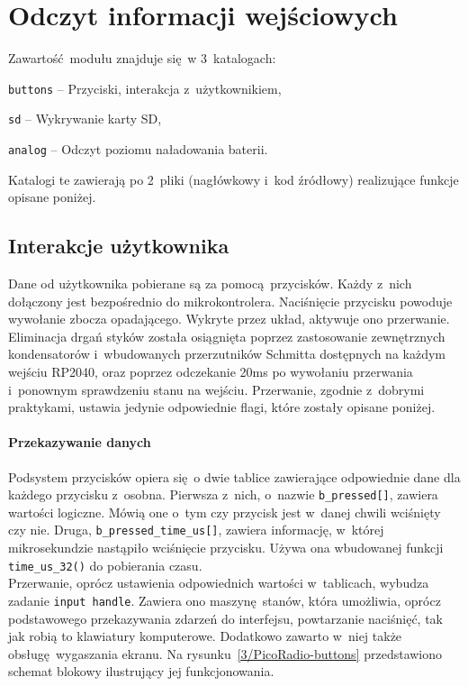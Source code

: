 \documentclass[polish]{aghengthesis}
\let\tempone\itemize
\let\temptwo\enditemize
\renewenvironment{itemize}{\tempone\setlength{\itemsep}{0cm}}{\temptwo}
\begin{document}
	\section{Odczyt informacji wejściowych}
		\noindent
		Zawartość modułu znajduje się w 3~katalogach:
		\begin{itemize}
			\item \lstinline|buttons| -- Przyciski, interakcja z~użytkownikiem,
			\item \lstinline|sd| -- Wykrywanie karty SD,
			\item \lstinline|analog| -- Odczyt poziomu naładowania baterii.
		\end{itemize}
		
		Katalogi te zawierają po 2~pliki (nagłówkowy i~kod źródłowy) realizujące funkcje opisane poniżej.
		
		\subsection{Interakcje użytkownika}
			Dane od użytkownika pobierane są za pomocą przycisków. Każdy z~nich dołączony jest bezpośrednio do mikrokontrolera. Naciśnięcie przycisku powoduje wywołanie zbocza opadającego. Wykryte przez układ, aktywuje ono przerwanie. Eliminacja drgań styków została osiągnięta poprzez zastosowanie zewnętrznych kondensatorów i~wbudowanych przerzutników Schmitta dostępnych na każdym wejściu RP2040, oraz poprzez odczekanie 20ms po wywołaniu przerwania i~ponownym sprawdzeniu stanu na wejściu. Przerwanie, zgodnie z~dobrymi praktykami, ustawia jedynie odpowiednie flagi, które zostały opisane poniżej.
			
			\paragraph{Przekazywanie danych}
				Podsystem przycisków opiera się o dwie tablice zawierające odpowiednie dane dla każdego przycisku z~osobna. Pierwsza z~nich, o~nazwie \lstinline|b_pressed[]|, zawiera wartości logiczne. Mówią one o~tym czy przycisk jest w~danej chwili wciśnięty czy nie. Druga, \lstinline|b_pressed_time_us[]|, zawiera informację, w~której mikrosekundzie nastąpiło wciśnięcie przycisku. Używa ona wbudowanej funkcji \lstinline|time_us_32()| do pobierania czasu.
			$ $\\
			
			Przerwanie, oprócz ustawienia odpowiednich wartości w~tablicach, wybudza zadanie \lstinline|input handle|. Zawiera ono maszynę stanów, która umożliwia, oprócz podstawowego przekazywania zdarzeń do interfejsu, powtarzanie naciśnięć, tak jak robią to klawiatury komputerowe. Dodatkowo zawarto w~niej także obsługę wygaszania ekranu. Na rysunku~\ref{3/PicoRadio-buttons} przedstawiono schemat blokowy ilustrujący jej funkcjonowania.
			
\end{document}

